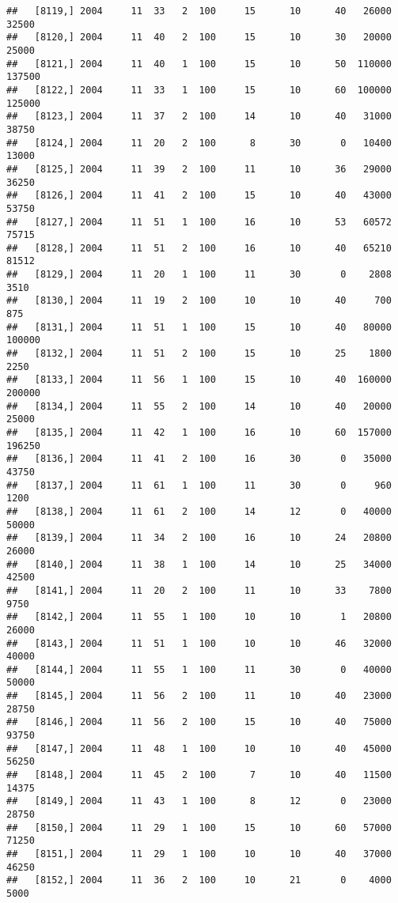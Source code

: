 \documentclass{article}\usepackage[]{graphicx}\usepackage[]{color}
\makeatletter
\newenvironment{kframe}{%
 \def\at@end@of@kframe{}%
 \ifinner\ifhmode%
  \def\at@end@of@kframe{\end{minipage}}%
  \begin{minipage}{\columnwidth}%
 \fi\fi%
 \def\FrameCommand##1{\hskip\@totalleftmargin \hskip-\fboxsep
 \colorbox{shadecolor}{##1}\hskip-\fboxsep
     \hskip-\linewidth \hskip-\@totalleftmargin \hskip\columnwidth}%
 \MakeFramed {\advance\hsize-\width
   \@totalleftmargin\z@ \linewidth\hsize
   \@setminipage}}%
 {\par\unskip\endMakeFramed%
 \at@end@of@kframe}
\newenvironment{knitrout}{}{} %
\makeatother
\begin{document}
\begin{knitrout}
\begin{kframe}
\begin{verbatim}
##   [8119,] 2004     11  33   2  100     15      10      40   26000   32500
##   [8120,] 2004     11  40   2  100     15      10      30   20000   25000
##   [8121,] 2004     11  40   1  100     15      10      50  110000  137500
##   [8122,] 2004     11  33   1  100     15      10      60  100000  125000
##   [8123,] 2004     11  37   2  100     14      10      40   31000   38750
##   [8124,] 2004     11  20   2  100      8      30       0   10400   13000
##   [8125,] 2004     11  39   2  100     11      10      36   29000   36250
##   [8126,] 2004     11  41   2  100     15      10      40   43000   53750
##   [8127,] 2004     11  51   1  100     16      10      53   60572   75715
##   [8128,] 2004     11  51   2  100     16      10      40   65210   81512
##   [8129,] 2004     11  20   1  100     11      30       0    2808    3510
##   [8130,] 2004     11  19   2  100     10      10      40     700     875
##   [8131,] 2004     11  51   1  100     15      10      40   80000  100000
##   [8132,] 2004     11  51   2  100     15      10      25    1800    2250
##   [8133,] 2004     11  56   1  100     15      10      40  160000  200000
##   [8134,] 2004     11  55   2  100     14      10      40   20000   25000
##   [8135,] 2004     11  42   1  100     16      10      60  157000  196250
##   [8136,] 2004     11  41   2  100     16      30       0   35000   43750
##   [8137,] 2004     11  61   1  100     11      30       0     960    1200
##   [8138,] 2004     11  61   2  100     14      12       0   40000   50000
##   [8139,] 2004     11  34   2  100     16      10      24   20800   26000
##   [8140,] 2004     11  38   1  100     14      10      25   34000   42500
##   [8141,] 2004     11  20   2  100     11      10      33    7800    9750
##   [8142,] 2004     11  55   1  100     10      10       1   20800   26000
##   [8143,] 2004     11  51   1  100     10      10      46   32000   40000
##   [8144,] 2004     11  55   1  100     11      30       0   40000   50000
##   [8145,] 2004     11  56   2  100     11      10      40   23000   28750
##   [8146,] 2004     11  56   2  100     15      10      40   75000   93750
##   [8147,] 2004     11  48   1  100     10      10      40   45000   56250
##   [8148,] 2004     11  45   2  100      7      10      40   11500   14375
##   [8149,] 2004     11  43   1  100      8      12       0   23000   28750
##   [8150,] 2004     11  29   1  100     15      10      60   57000   71250
##   [8151,] 2004     11  29   1  100     10      10      40   37000   46250
##   [8152,] 2004     11  36   2  100     10      21       0    4000    5000

\end{verbatim}
\end{kframe}
\end{knitrout}
\end{document}
